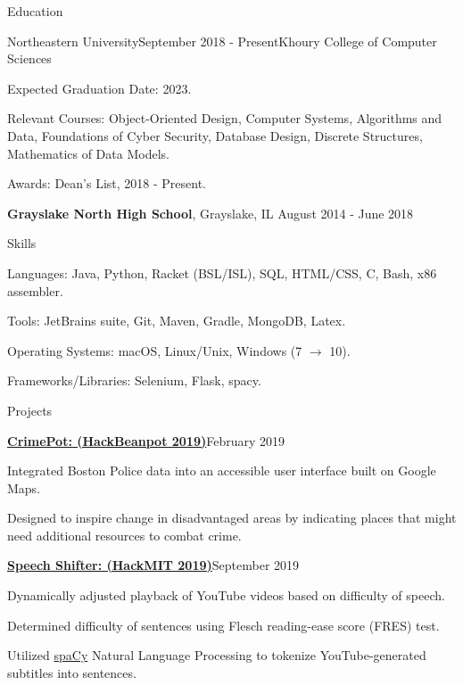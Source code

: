 \documentclass{resume}
\begin{document}
\begin{rSection}{Education}
\begin{rSubsection}{Northeastern University}{September 2018 - Present}{Khoury College of Computer Sciences}{}
\item Expected Graduation Date: 2023.
\item Relevant Courses: Object-Oriented Design, Computer Systems, Algorithms and Data, Foundations of Cyber Security, Database Design, Discrete Structures, Mathematics of Data Models.
\item Awards: Dean's List, 2018 - Present.
\end{rSubsection}

{\bf Grayslake North High School}, Grayslake, IL \hfill {August 2014 - June 2018}

\end{rSection}

\begin{rSection}{Skills}
  \begin{list}{\tiny\raisebox{1ex}{\textbullet}}{\leftmargin=2.0em}
    \item Languages: Java, Python, Racket (BSL/ISL), SQL, HTML/CSS, C, Bash, x86 assembler. 
    \item Tools: JetBrains suite, Git, Maven, Gradle, MongoDB, Latex.
    \item Operating Systems: macOS, Linux/Unix, Windows (7 $\to$ 10).
    \item Frameworks/Libraries: Selenium, Flask, spacy.
  \end{list}
\end{rSection}
\begin{rSection}{Projects}

\begin{rSubsection}{\href{https://www.devpost.com/software/CrimePot}{{\bf CrimePot: (HackBeanpot 2019)}}}{February 2019}{}{}
\item Integrated Boston Police data into an accessible user interface built on Google Maps.
\item Designed to inspire change in disadvantaged areas by indicating places that might need additional resources to combat crime.
\end{rSubsection}

\begin{rSubsection}{\href{https://www.devpost.com/software/SpeechShifter}{\bf Speech Shifter: (HackMIT 2019)}}{September 2019}{}{}
\item Dynamically adjusted playback of YouTube videos based on difficulty of speech. 
\item Determined difficulty of sentences using Flesch reading-ease score (FRES) test.
\item Utilized \href{https://www.spacy.io}{spaCy} Natural Language Processing to tokenize YouTube-generated subtitles into sentences.
\end{rSubsection}

\end{rSection}
\end{document}
